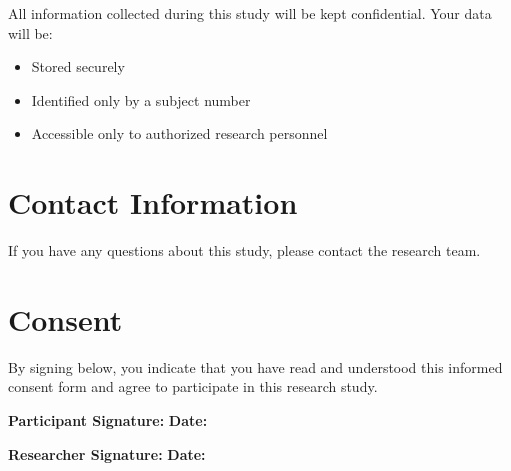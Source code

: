 \documentclass{article}
\begin{document}
All information collected during this study will be kept confidential. Your data will be:

\begin{itemize}
    \item Stored securely
    \item Identified only by a subject number
    \item Accessible only to authorized research personnel
\end{itemize}

\section{Contact Information}

If you have any questions about this study, please contact the research team.

\section{Consent}

By signing below, you indicate that you have read and understood this informed consent form and agree to participate in this research study.

\vspace{1cm}

\noindent
\textbf{Participant Signature:} \underline{\hspace{6cm}} \textbf{Date:} \underline{\hspace{3cm}}

\vspace{0.5cm}

\noindent
\textbf{Researcher Signature:} \underline{\hspace{6cm}} \textbf{Date:} \underline{\hspace{3cm}}
\end{document}
